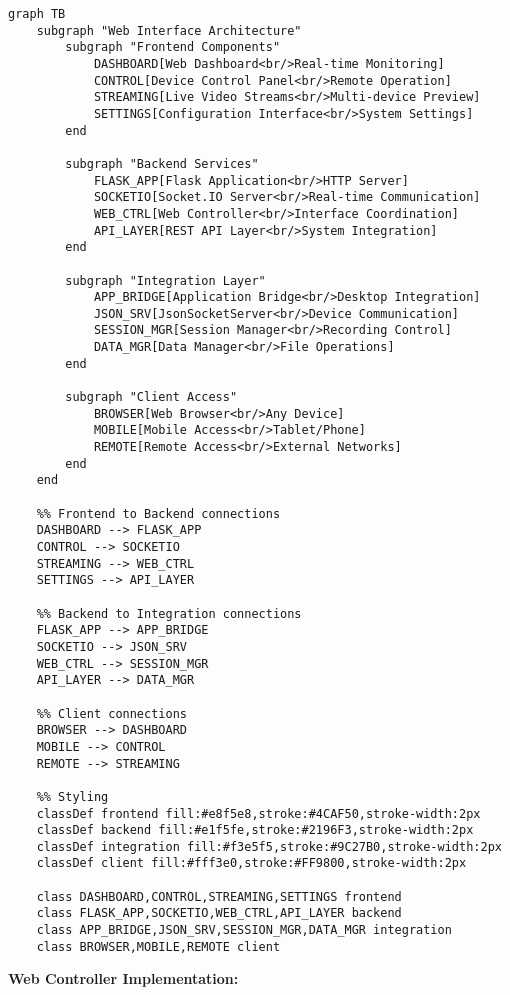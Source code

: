 \documentclass[12pt,a4paper]{article}
\begin{document}
\begin{verbatim}
graph TB
    subgraph "Web Interface Architecture"
        subgraph "Frontend Components"
            DASHBOARD[Web Dashboard<br/>Real-time Monitoring]
            CONTROL[Device Control Panel<br/>Remote Operation]
            STREAMING[Live Video Streams<br/>Multi-device Preview]
            SETTINGS[Configuration Interface<br/>System Settings]
        end
        
        subgraph "Backend Services"
            FLASK_APP[Flask Application<br/>HTTP Server]
            SOCKETIO[Socket.IO Server<br/>Real-time Communication]
            WEB_CTRL[Web Controller<br/>Interface Coordination]
            API_LAYER[REST API Layer<br/>System Integration]
        end
        
        subgraph "Integration Layer"
            APP_BRIDGE[Application Bridge<br/>Desktop Integration]
            JSON_SRV[JsonSocketServer<br/>Device Communication]
            SESSION_MGR[Session Manager<br/>Recording Control]
            DATA_MGR[Data Manager<br/>File Operations]
        end
        
        subgraph "Client Access"
            BROWSER[Web Browser<br/>Any Device]
            MOBILE[Mobile Access<br/>Tablet/Phone]
            REMOTE[Remote Access<br/>External Networks]
        end
    end
    
    %% Frontend to Backend connections
    DASHBOARD --> FLASK_APP
    CONTROL --> SOCKETIO
    STREAMING --> WEB_CTRL
    SETTINGS --> API_LAYER
    
    %% Backend to Integration connections
    FLASK_APP --> APP_BRIDGE
    SOCKETIO --> JSON_SRV
    WEB_CTRL --> SESSION_MGR
    API_LAYER --> DATA_MGR
    
    %% Client connections
    BROWSER --> DASHBOARD
    MOBILE --> CONTROL
    REMOTE --> STREAMING
    
    %% Styling
    classDef frontend fill:#e8f5e8,stroke:#4CAF50,stroke-width:2px
    classDef backend fill:#e1f5fe,stroke:#2196F3,stroke-width:2px
    classDef integration fill:#f3e5f5,stroke:#9C27B0,stroke-width:2px
    classDef client fill:#fff3e0,stroke:#FF9800,stroke-width:2px
    
    class DASHBOARD,CONTROL,STREAMING,SETTINGS frontend
    class FLASK_APP,SOCKETIO,WEB_CTRL,API_LAYER backend
    class APP_BRIDGE,JSON_SRV,SESSION_MGR,DATA_MGR integration
    class BROWSER,MOBILE,REMOTE client
\end{verbatim}

\textbf{Web Controller Implementation:}
\end{document}
